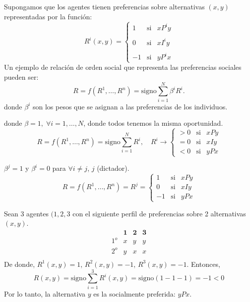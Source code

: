 \begin{ejem} Supongamos que los agentes tienen preferencias sobre alternativas $(x,y)$ representadas por la función:
    $$
    R^i(x,y) = 
	\left\{
	    \begin{array}{rcl}
		1 & \mbox{si} & xP^iy\\\\
		0 & \mbox{si} & xI^iy\\\\
		-1 & \mbox{si} & yP^ix
	    \end{array}
	\right.
    $$
    Un ejemplo de relación de orden social que representa las preferencias sociales pueden ser:
    $$ R = f(R^1,\ldots,R^n) = \text{signo} \sum_{i=1}^N \beta^i R^i.$$
    donde $\beta^i$ son los pesos que se asignan a las preferencias de los individuos.
\end{ejem}

\begin{ejem} donde $\beta=1, \; \forall i = 1,\ldots,N$, donde todos tenemos la misma oportunidad.
    $$R=f(R^1,\ldots,R^n)=\text{signo} \sum_{i=1}^N R^i, \quad 
    R^i \to
	\left\{
	    \begin{array}{rcl}
		>0 & \mbox{si} & xPy\\
		=0 & \mbox{si} & xIy\\
		<0 & \mbox{si} & yPx
	    \end{array}
	\right.
    $$
\end{ejem}

\begin{ejem}[Dictadura] $\beta^j=1$ y $\beta^i=0$ para $\forall i\neq j$, $j$ (dictador).
	$$R=f(R^1,\ldots,R^n) =
	R^j  = 
	\left\{
	    \begin{array}{rcl}
		1 & \mbox{si} & xPy\\
		0 & \mbox{si} & xIy\\
		-1 & \mbox{si} & yPx
	    \end{array}
	\right.
	$$
\end{ejem}

\begin{ejem} Sean $3$ agentes $(1,2,3$ con el siguiente perfil de preferencias sobre 2 alternativas $(x,y)$.
    $$
    \begin{matrix}
	& \textbf{1} & \textbf{2} & \textbf{3}\\
	1^o & x & y & y\\
	2^o & y & x & x\\
    \end{matrix}
    $$
    De donde, $R^1(x,y)=1$, $R^2(x,y)=-1$, $R^3(x,y)=-1$. Entonces, 
    $$R(x,y)=\text{signo} \sum_{i=1}^3 R^i(x,y)=\text{signo}(1-1-1)=-1<0$$
    Por lo tanto, la alternativa $y$ es la socialmente preferida: $yPx$.
\end{ejem}

